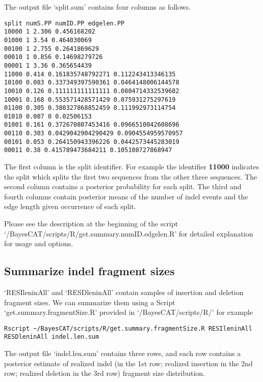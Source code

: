 \documentclass[11pt]{article}
\begin{document}
The output file `split.sum' contains four columns as follows.
\begin{lstlisting}
split numS.PP numID.PP edgelen.PP
10000 1 2.306 0.456168202
01000 1 3.54 0.464030069
00100 1 2.755 0.2641869629
00010 1 0.856 0.14698279726
00001 1 3.36 0.365654439
11000 0.414 0.161835748792271 0.112243413346135
10100 0.083 0.337349397590361 0.0464148006144578
10010 0.126 0.111111111111111 0.0804714332539682
10001 0.168 0.553571428571429 0.075931275297619
01100 0.305 0.380327868852459 0.111992973114754
01010 0.007 0 0.02506153
01001 0.161 0.372670807453416 0.0966510042608696
00110 0.303 0.0429042904290429 0.0904554959570957
00101 0.053 0.264150943396226 0.0442573445283019
00011 0.38 0.415789473684211 0.105108727868947
\end{lstlisting}
The first column is the split identifier. For example the identifier \textbf{11000} indicates the split which splits the first two sequences from the other three sequences. The second column contains a posterior probability for each split. The third and fourth columns contain posterior means of the number of indel events and the edge length given occurrence of each split.

Please see the description at the beginning of the script `/BayesCAT/scripts/R/get.summary.numID.edgelen.R' for detailed explanation for usage and options.

\subsection{Summarize indel fragment sizes}
\label{sec-3-4}
`RESIleninAll' and `RESDleninAll' contain samples of insertion and deletion fragment sizes. We can summarize them using a Script `get.summary.fragmentSize.R' provided in `/BayesCAT/scripts/R/' for example
\begin{lstlisting}
Rscript ~/BayesCAT/scripts/R/get.summary.fragmentSize.R RESIleninAll RESDleninAll indel.len.sum
\end{lstlisting}
The output file `indel.len.sum' contains three rows, and each row contains a posterior estimate of realized indel (in the 1st row; realized insertion in the 2nd row; realized deletion in the 3rd row) fragment size distribution.
\end{document}
